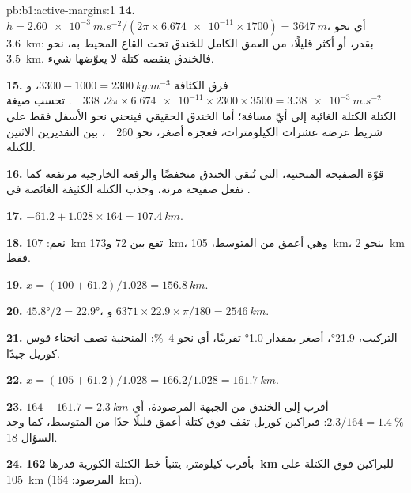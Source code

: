 \begin{solution}{pb:b1:active-margins:1}
\textbf{14.} $h = \qty{2.60e-3}{m.s^{-2}}/(2\pi\times\num{6.674e-11}\times1700)
= \qty{3647}{m}$، أي نحو \qty{3.6}{km}: بقدر، أو أكثر قليلًا، من العمق الكامل للخندق تحت القاع المحيط به، نحو \qty{3.5}{km}. فالخندق ينقصه كتلة لا يعوّضها شيء.

\textbf{15.} فرق الكثافة $3300 - 1000 = \qty{2300}{kg.m^{-3}}$،
و$2\pi\times\num{6.674e-11}\times2300\times3500 = \qty{3.38e-3}{m.s^{-2}}$،
\qty{338}{\milli\gal}. تحسب صيغة الكتلة الكتلة الغائبة إلى أيّ مسافة؛ أما الخندق الحقيقي فينحني نحو الأسفل فقط على شريط عرضه عشرات الكيلومترات، فعجزه أصغر، نحو \qty{260}{\milli\gal}، بين التقديرين الاثنين للكتلة.

\textbf{16.} قوّة الصفيحة المنحنية، التي تُبقي الخندق منخفضًا والرفعة الخارجية مرتفعة كما تفعل صفيحة مرنة، وجذب الكتلة الكثيفة الغائصة في .

\textbf{17.} $-61.2 + 1.028\times164 = \qty{107.4}{km}$.

\textbf{18.} نعم: \qty{107}{km} تقع بين 72 و\qty{173}{km}، وهي أعمق من المتوسط، \qty{105}{km}، بنحو \qty{2}{km} فقط.

\textbf{19.} $x = (100 + 61.2)/1.028 = \qty{156.8}{km}$.

\textbf{20.} $\ang{45.8}/2 = \ang{22.9}$، و
$6371\times22.9\times\pi/180 = \qty{2546}{km}$.

\textbf{21.} التركيب، \ang{21.9}، أصغر بمقدار \ang{1.0} تقريبًا، أي نحو \qty{4}{\percent}:  المنحنية تصف انحناء قوس كوريل جيدًا.

\textbf{22.} $x = (105 + 61.2)/1.028 = 166.2/1.028 = \qty{161.7}{km}$.

\textbf{23.} $164 - 161.7 = \qty{2.3}{km}$ أقرب إلى الخندق من الجبهة المرصودة، أي $2.3/164 = \qty{1.4}{\percent}$: فبراكين كوريل تقف فوق كتلة أعمق قليلًا جدًا من المتوسط، كما وجد السؤال 18.

\textbf{24.} بأقرب كيلومتر، يتنبأ خط الكتلة الكورية  قدرها \textbf{\qty[text-series-to-math=true]{162}{km}} للبراكين فوق الكتلة على \qty{105}{km} (المرصود: \qty{164}{km}).
\end{solution}
